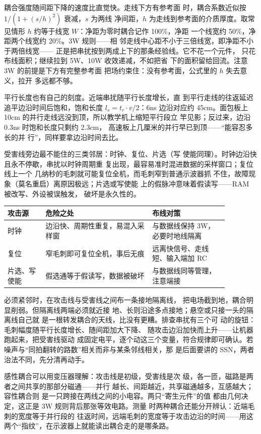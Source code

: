 耦合强度随间距下降的速度比直觉快。走线下方有参考面
时，耦合系数近似按 $1/(1+(s/h)^2)$ 衰减，$s$ 为两线
净间距，$h$ 为走线到参考面的介质厚度。取常见情形
$h$ 约等于线宽 $W$：净距为零时耦合记作 100\%，净距
一个线宽约 50\%，净距两个线宽约 20\%。3W 规则——相
邻走线中心距不小于三倍线宽，即净距不小于两倍线宽——
正是把串扰按到两成上下的那条经验线。它不花一个元件，
只花布线面积；继续拉到 5W、10W 收效递减，不如把省
下的面积留给回流。注意 3W 的前提是下方有完整参考面
把场约束住：没有参考面，公式里的 $h$ 失去意义，拉开
多远都不够。

平行长度也有自己的刻度。近端串扰随平行长度增长，直
到平行走线的往返延迟追平边沿时间后饱和，饱和长度
$l_s=t_r\cdot v/2$：6ns 边沿对应约 45cm。面包板上
10cm 的并行走线远没到顶，所以教学机上缩短平行段立
竿见影；反过来，边沿 0.3ns 时饱和长度只剩约 2.3cm，
高速板上几厘米的并行早已到顶——“能容忍多长的并
行”，同样要拿边沿时间去比。

受害线旁边最不能住的三类邻居：时钟、复位、片选（写
使能同理）。时钟边沿快且永不停歇，串扰以时钟周期重
复出现，最容易准时混进数据的采样窗口；复位线上一个
几纳秒的毛刺就可能复位全机，而毛刺窄到普通示波器抓
不住，故障现象（莫名重启）离原因极远；片选或写使能
上的假脉冲意味着假读写——RAM 被改写、外设被误触发，
破坏是永久性的。

\begin{longtable}{L{0.15\linewidth}L{0.42\linewidth}L{0.3\linewidth}}
\toprule
攻击源 & 危险之处 & 布线对策 \\
\midrule
时钟 & 边沿快、周期性重复，易混入采样窗 & 与数据线保持 3W，必要时地线隔离 \\
复位 & 窄毛刺即可复位全机，事后无痕 & 远离快信号、走线短、输入端加 RC \\
片选、写使能 & 假选通等于假读写，数据被破坏 & 与数据线同等管理，注意端接 \\
\bottomrule
\end{longtable}

必须紧邻时，在攻击线与受害线之间布一条接地隔离线，
把电场截到地，耦合明显削弱。但隔离线两端必须就近接
地、长则沿途多点接地；悬空或只接一头的隔离线自己就
是一根转发耦合的天线，比没有更糟。排查串扰有三个可
动的旋钮：毛刺幅度随平行长度增长、随间距加大下降、
随攻击边沿加快而上升——让机器跑起来，把受害线驱动
成固定电平，逐个动这三个变量，符合规律即可确认。若
噪声与“同拍翻转的路数”相关而非与某条邻线相关，那
是后面要讲的 SSN，两者治法不同，先分清再动手。

感性耦合可以用变压器理解：攻击线是初级，受害线是次
级，各一匝，磁路是两者之间共享的那部分磁通——并行
越长、间距越近，共享磁通越多，互感越大；容性耦合则
是一只跨接在两线之间的小电容。两只“寄生元件”的值
都由几何决定，这正是 3W 规则背后那张等效电路。测量
时两种耦合还能分开辨认：近端毛刺的宽度等于并行段的
往返时间，远端毛刺的宽度等于攻击边沿的时间——用这
两个“指纹”，在示波器上就能读出耦合走的是哪条路。

